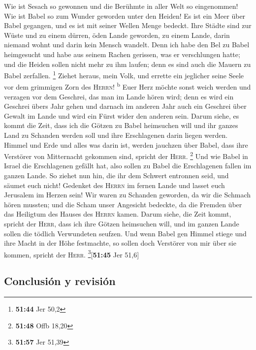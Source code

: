  Wie ist Sesach so gewonnen und die Berühmte in aller
Welt so eingenommen! Wie ist Babel so zum Wunder geworden unter den
Heiden!  Es ist ein Meer über Babel gegangen, und es ist
mit seiner Wellen Menge bedeckt.  Ihre Städte sind zur
Wüste und zu einem dürren, öden Lande geworden, zu einem Lande, darin
niemand wohnt und darin kein Mensch wandelt.  Denn ich
habe den Bel zu Babel heimgesucht und habe aus seinem Rachen gerissen,
was er verschlungen hatte; und die Heiden sollen nicht mehr zu ihm
laufen; denn es sind auch die Mauern zu Babel zerfallen. \footnote{\textbf{51:44}
  Jer 50,2}  Ziehet heraus, mein Volk, und errette ein
jeglicher seine Seele vor dem grimmigen Zorn des \textsc{Herrn}!
\textsuperscript{b}  Euer Herz möchte sonst weich werden
und verzagen vor dem Geschrei, das man im Lande hören wird; denn es wird
ein Geschrei übers Jahr gehen und darnach im anderen Jahr auch ein
Geschrei über Gewalt im Lande und wird ein Fürst wider den anderen sein.
 Darum siehe, es kommt die Zeit, dass ich die Götzen zu
Babel heimsuchen will und ihr ganzes Land zu Schanden werden soll und
ihre Erschlagenen darin liegen werden.  Himmel und Erde
und alles was darin ist, werden jauchzen über Babel, dass ihre Verstörer
von Mitternacht gekommen sind, spricht der \textsc{Herr}. \footnote{\textbf{51:48}
  Offb 18,20}  Und wie Babel in Israel die Erschlagenen
gefällt hat, also sollen zu Babel die Erschlagenen fallen im ganzen
Lande.  So ziehet nun hin, die ihr dem Schwert entronnen
seid, und säumet euch nicht! Gedenket des \textsc{Herrn} im fernen Lande
und lasset euch Jerusalem im Herzen sein!  Wir waren zu
Schanden geworden, da wir die Schmach hören mussten; und die Scham unser
Angesicht bedeckte, da die Fremden über das Heiligtum des Hauses des
\textsc{Herrn} kamen.  Darum siehe, die Zeit kommt,
spricht der \textsc{Herr}, dass ich ihre Götzen heimsuchen will, und im
ganzen Lande sollen die tödlich Verwundeten seufzen.  Und
wenn Babel gen Himmel stiege und ihre Macht in der Höhe festmachte, so
sollen doch Verstörer von mir über sie kommen, spricht der
\textsc{Herr}. \footnote{\textbf{51:57} Jer 51,39}{[}\textbf{51:45} Jer
51,6{]}

\hypertarget{conclusiuxf3n-y-revisiuxf3n}{%
\subsection{Conclusión y revisión}\label{conclusiuxf3n-y-revisiuxf3n}}

